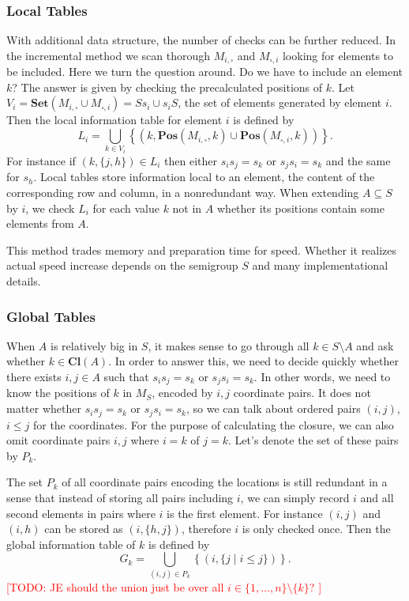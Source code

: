\documentclass{amsart}
\newcommand{\Set}{\mathbf{Set}}
\newcommand{\Closure}{\mathbf{Cl}}
\newcommand{\Pos}{\mathbf{Pos}}
\newcommand{\todo}[1]{\textcolor{red}{ \small \textsf{[TODO:  #1 ]} \normalsize}}
\theoremstyle{plain}
\theoremstyle{definition}
\begin{document}
\subsubsection{Local Tables}
With additional data structure, the number of checks can be further reduced. 
In the incremental method we scan thorough $M_{i,\square}$ and $M_{\square,i}$ looking for elements to be included.
Here we turn the question around.
Do we have to include an element $k$?
The answer is given by checking the precalculated positions of $k$. 
Let $V_i=\Set(M_{i,\square}\cup M_{\square,i})=Ss_i\cup s_iS$, the set of elements generated by element $i$.
Then the  local information table for element $i$ is defined by
$$L_i=\bigcup_{k\in V_i}\left\{(k,\Pos(M_{i,\square},k)\cup\Pos(M_{\square,i},k))\right\}.$$
For instance if $(k,\{j,h\})\in L_i$ then either $s_is_j=s_k$ or $s_js_i=s_k$ and the same for $s_h$.
Local tables store information local to an element, the content of the corresponding row and column, in a nonredundant way.
When  extending $A\subseteq S$ by $i$, we check $L_i$ for each value $k$ not in $A$ whether its positions contain some elements from $A$. 

This method trades memory and preparation time for speed. Whether it realizes actual speed increase depends on the semigroup $S$ and many implementational details.

\subsubsection{Global Tables}
When $A$ is relatively big in $S$, it makes sense to go through all $k\in S\setminus A$ and ask whether $k\in\Closure(A)$. 
In order to answer this, we need to decide quickly whether there exists $i,j\in A$ such that $s_is_j=s_k$ or $s_js_i=s_k$.
In other words, we need to know the positions of $k$ in $M_S$, encoded by $i,j$ coordinate pairs.
It does not matter whether $s_is_j=s_k$ or $s_js_i=s_k$, so we can talk about ordered pairs $(i,j)$, $i\leq j$ for the coordinates. 
For the purpose of calculating the closure, we can also omit coordinate pairs $i,j$ where $i=k$ of $j=k$. 
Let's denote the set of these pairs by $P_k$.

The set $P_k$ of all coordinate pairs encoding the locations is still redundant in a sense that instead of storing all pairs including $i$, we can simply record $i$ and all second  elements in  pairs where $i$ is the first element.
For instance $(i,j)$ and $(i,h)$ can be stored as $(i,\{h,j\})$, therefore $i$ is only checked once.
Then the  global information table of $k$ is defined by
$$G_k=\bigcup_{(i,j)\in P_k} \left\{ (i,\{j\mid i\leq j\})\right\}.$$
\todo{JE should the union just be over all $i\in\{1,\ldots,n\}\setminus\{k\}$?}
\end{document}

